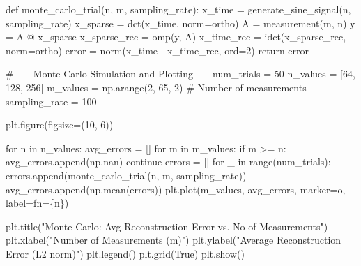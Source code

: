 \documentclass[
  letterpaper,
  DIV=11,
  numbers=noendperiod]{scrartcl}
\newenvironment{Shaded}{\begin{snugshade}}{\end{snugshade}}
\newcommand{\BuiltInTok}[1]{\textcolor[rgb]{0.40,0.85,0.94}{#1}}
\newcommand{\CommentTok}[1]{\textcolor[rgb]{0.46,0.44,0.37}{#1}}
\newcommand{\ControlFlowTok}[1]{\textcolor[rgb]{0.98,0.15,0.45}{#1}}
\newcommand{\DecValTok}[1]{\textcolor[rgb]{0.68,0.51,1.00}{#1}}
\newcommand{\KeywordTok}[1]{\textcolor[rgb]{0.98,0.15,0.45}{#1}}
\newcommand{\NormalTok}[1]{\textcolor[rgb]{0.97,0.97,0.95}{#1}}
\newcommand{\OperatorTok}[1]{\textcolor[rgb]{0.97,0.97,0.95}{#1}}
\newcommand{\SpecialCharTok}[1]{\textcolor[rgb]{0.68,0.51,1.00}{#1}}
\newcommand{\SpecialStringTok}[1]{\textcolor[rgb]{0.90,0.86,0.45}{#1}}
\newcommand{\StringTok}[1]{\textcolor[rgb]{0.90,0.86,0.45}{#1}}
\newcommand{\VariableTok}[1]{\textcolor[rgb]{0.97,0.97,0.95}{#1}}
\begin{document}
\begin{Shaded}
\begin{Highlighting}[]
\KeywordTok{def}\NormalTok{ monte\_carlo\_trial(n, m, sampling\_rate):}
\NormalTok{    x\_time }\OperatorTok{=}\NormalTok{ generate\_sine\_signal(n, sampling\_rate)}
\NormalTok{    x\_sparse }\OperatorTok{=}\NormalTok{ dct(x\_time, norm}\OperatorTok{=}\StringTok{\textquotesingle{}ortho\textquotesingle{}}\NormalTok{)}
\NormalTok{    A }\OperatorTok{=}\NormalTok{ measurement(m, n)}
\NormalTok{    y }\OperatorTok{=}\NormalTok{ A }\OperatorTok{@}\NormalTok{ x\_sparse}
\NormalTok{    x\_sparse\_rec }\OperatorTok{=}\NormalTok{ omp(y, A)}
\NormalTok{    x\_time\_rec }\OperatorTok{=}\NormalTok{ idct(x\_sparse\_rec, norm}\OperatorTok{=}\StringTok{\textquotesingle{}ortho\textquotesingle{}}\NormalTok{)}
\NormalTok{    error }\OperatorTok{=}\NormalTok{ norm(x\_time }\OperatorTok{{-}}\NormalTok{ x\_time\_rec, }\BuiltInTok{ord}\OperatorTok{=}\DecValTok{2}\NormalTok{)}
    \ControlFlowTok{return}\NormalTok{ error}

\CommentTok{\# {-}{-}{-}{-} Monte Carlo Simulation and Plotting {-}{-}{-}{-}}
\NormalTok{num\_trials }\OperatorTok{=} \DecValTok{50}
\NormalTok{n\_values }\OperatorTok{=}\NormalTok{ [}\DecValTok{64}\NormalTok{, }\DecValTok{128}\NormalTok{, }\DecValTok{256}\NormalTok{]}
\NormalTok{m\_values }\OperatorTok{=}\NormalTok{ np.arange(}\DecValTok{2}\NormalTok{, }\DecValTok{65}\NormalTok{, }\DecValTok{2}\NormalTok{)  }\CommentTok{\# Number of measurements}
\NormalTok{sampling\_rate }\OperatorTok{=} \DecValTok{100}

\NormalTok{plt.figure(figsize}\OperatorTok{=}\NormalTok{(}\DecValTok{10}\NormalTok{, }\DecValTok{6}\NormalTok{))}

\ControlFlowTok{for}\NormalTok{ n }\KeywordTok{in}\NormalTok{ n\_values:}
\NormalTok{    avg\_errors }\OperatorTok{=}\NormalTok{ []}
    \ControlFlowTok{for}\NormalTok{ m }\KeywordTok{in}\NormalTok{ m\_values:}
        \ControlFlowTok{if}\NormalTok{ m }\OperatorTok{\textgreater{}=}\NormalTok{ n:}
\NormalTok{            avg\_errors.append(np.nan)}
            \ControlFlowTok{continue}
\NormalTok{        errors }\OperatorTok{=}\NormalTok{ []}
        \ControlFlowTok{for}\NormalTok{ \_ }\KeywordTok{in} \BuiltInTok{range}\NormalTok{(num\_trials):}
\NormalTok{            errors.append(monte\_carlo\_trial(n, m, sampling\_rate))}
\NormalTok{        avg\_errors.append(np.mean(errors))}
\NormalTok{    plt.plot(m\_values, avg\_errors, marker}\OperatorTok{=}\StringTok{\textquotesingle{}o\textquotesingle{}}\NormalTok{, label}\OperatorTok{=}\SpecialStringTok{f\textquotesingle{}n=}\SpecialCharTok{\{}\NormalTok{n}\SpecialCharTok{\}}\SpecialStringTok{\textquotesingle{}}\NormalTok{)}

\NormalTok{plt.title(}\StringTok{"Monte Carlo: Avg Reconstruction Error vs. No of Measurements"}\NormalTok{)}
\NormalTok{plt.xlabel(}\StringTok{"Number of Measurements (m)"}\NormalTok{)}
\NormalTok{plt.ylabel(}\StringTok{"Average Reconstruction Error (L2 norm)"}\NormalTok{)}
\NormalTok{plt.legend()}
\NormalTok{plt.grid(}\VariableTok{True}\NormalTok{)}
\NormalTok{plt.show()}
\end{Highlighting}
\end{Shaded}
\end{document}
